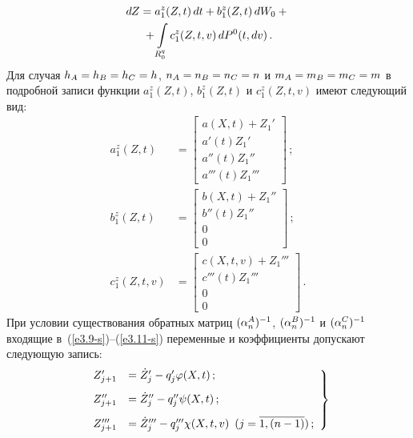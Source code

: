 \begin{multicols}{2}
\pagebreak

\noindent
    \begin{multline}
    dZ = a_1^z (Z, t)\, dt + b_1^z (Z, t)\,dW_0+{}\\
    {}+ 
    \int\limits_{R_0^q} c_1^z (Z,  t, v) \,d P^0 (t, dv)\,.
    \label{e3.8-s}
    \end{multline}
Для случая  $h_A \hm= h_B \hm= h_C\hm=h$, $n_A\hm= n_B\hm=n_C\hm=n$ и 
$m_A\hm=m_B\hm=m_C\hm=m$ 
в подробной записи функции $a^z_1 (Z,t)$, $b^z_1 (Z,t)$ и $c^z_1 (Z, t,v)$ имеют следующий вид:
    \begin{align}
    a_1^z (Z, t)&=\begin{bmatrix}
        a(X, t)+ Z_1'\\
        a'(t)Z_1'\\
        a''(t) Z_1''\\
        a'''(t)Z_1'''
        \end{bmatrix}\,;\label{e3.9-s}\\
b_1^z (Z, t)&=\begin{bmatrix}
        b(X, t)+ Z_1''\\
        b''(t)Z_1''\\
        0\\
        0\end{bmatrix}\,;\label{e3.10-s}\\
  c_1^z (Z, t,v)&=\begin{bmatrix}
        c(X, t,v)+ Z_1'''\\
        c'''(t)Z_1'''\\
        0\\
        0\end{bmatrix}\,.\label{e3.11-s}
        \end{align}
При условии существования обратных матриц $(\alpha_n^A)^{-1}$,
 $(\alpha_n^B)^{-1}$ и $(\alpha_n^C)^{-1}$ входящие в~(\ref{e3.9-s})--(\ref{e3.11-s}) 
 переменные и коэффициенты допускают  следующую запись:
 \begin{equation}
 \left.
 \begin{array}{rl}
    Z_{j+1}' &=\dot Z_j' - q_j' \varphi(X,t)\,;\\[9pt]
    Z_{j+1}'' &=\dot Z_j'' - q_j'' \psi(X,t)\,;\\[9pt]
 Z_{j+1}''' &=\dot Z_j'''- q_j''' \chi(X,t,v)\enskip (j=\overline{1,(n-1)})\,;
 \end{array}
 \right\}
 \end{equation}


\vspace*{-12pt}


\end{multicols}
